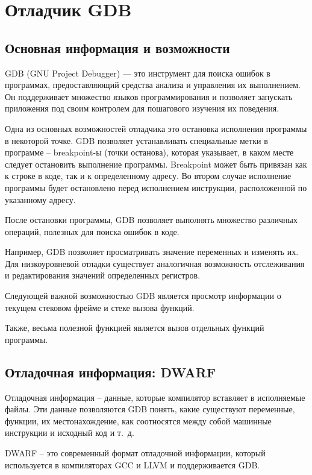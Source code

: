\section{Отладчик GDB}
\label{sec:gdb} 

\subsection {Основная информация и возможности}
\label{gdb:general}

GDB (GNU Project Debugger) — это инструмент для поиска ошибок в программах,
предоставляющий средства анализа и управления их выполнением. Он поддерживает
множество языков программирования и позволяет запускать приложения под своим
контролем для пошагового изучения их поведения.

Одна из основных возможностей отладчика это остановка исполнения программы в некоторой точке.
GDB позволяет устанавливать специальные метки в программе -- breakpoint-ы (точки останова),
которая указывает, в каком месте следует остановить выполнение программы. Breakpoint может
быть привязан как к строке в коде, так и к определенному адресу. Во втором случае исполнение
программы будет остановлено перед исполнением инструкции, расположенной по указанному адресу.

После остановки программы, GDB позволяет выполнять множество различных операций,
полезных для поиска ошибок в коде.

Например, GDB позволяет просматривать значение переменных и изменять их. Для низкоуровневой
отладки существует аналогичная возможность отслеживания и редактирования значений определенных
регистров.

Следующей важной возможностью GDB является просмотр информации о текущем стековом фрейме и
стеке вызова функций.

Также, весьма полезной функцией является вызов отдельных функций программы.

\subsection {Отладочная информация: DWARF}
\label{gdb:debuginfo}

Отладочная информация -- данные, которые компилятор вставляет в исполняемые файлы. Эти
данные позволяются GDB понять, какие существуют переменные, функции, их местонахождение,
как соотносятся между собой машинные инструкции и исходный код и т.~д.

DWARF -- это современный формат отладочной информации, который используется в компиляторах GCC
и LLVM и поддерживается GDB.

